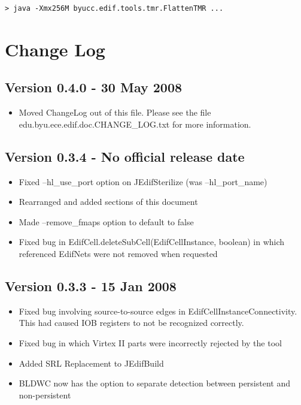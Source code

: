 \documentclass[english]{article}
\numberwithin{figure}{section}
\begin{document}
\begin{verbatim}
> java -Xmx256M byucc.edif.tools.tmr.FlattenTMR ...
\end{verbatim}

\section{Change Log}

\subsection*{Version 0.4.0 - 30 May 2008}
\begin{itemize}
\item Moved ChangeLog out of this file. Please see the file
edu.byu.ece.edif.doc.CHANGE\_LOG.txt for more information.
\end{itemize}

\subsection*{Version 0.3.4 - No official release date}
\begin{itemize}
\item Fixed --hl\_use\_port option on JEdifSterilize (was --hl\_port\_name)
\item Rearranged and added sections of this document
\item Made –remove\_fmaps option to default to false
\item Fixed bug in EdifCell.deleteSubCell(EdifCellInstance, boolean) in 
which referenced EdifNets were not removed when requested
\end{itemize}

\subsection*{Version 0.3.3 - 15 Jan 2008}
\begin{itemize}
\item Fixed bug involving source-to-source edges in
EdifCellInstanceConnectivity. This had caused IOB registers to not be recognized
correctly.
\item Fixed bug in which Virtex II parts were incorrectly rejected by the tool
\item Added SRL Replacement to JEdifBuild
\item BLDWC now has the option to separate detection between persistent and
non-persistent
\end{itemize}
\end{document}

